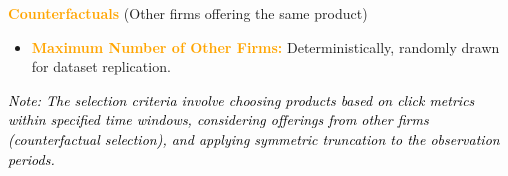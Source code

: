 \documentclass{article}
\begin{document}
\noindent
\textbf{\textcolor{orange}{Counterfactuals}} (Other firms offering the same product)

\begin{itemize}
    \item \textbf{\textcolor{orange}{Maximum Number of Other Firms:}} Deterministically, randomly drawn for dataset replication.
\end{itemize}

\noindent
\textit{\textcolor{black}{Note: The selection criteria involve choosing products based on click metrics within specified time windows, considering offerings from other firms (counterfactual selection), and applying symmetric truncation to the observation periods.}}
\end{document}

